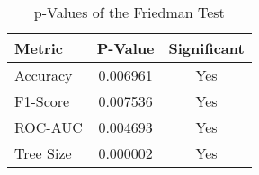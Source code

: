 
    \begin{table}[H]
        \centering
        \renewcommand{\arraystretch}{1.2}
        \caption{p-Values of the Friedman Test}
        \label{tab:RQ_Fitness_friedman}
    \begin{tabular}{lcc}
\toprule
Metric & P-Value & Significant \\
\midrule
Accuracy & 0.006961 & Yes \\
F1-Score & 0.007536 & Yes \\
ROC-AUC & 0.004693 & Yes \\
Tree Size & 0.000002 & Yes \\
\bottomrule
\end{tabular}

        
    \end{table}
    